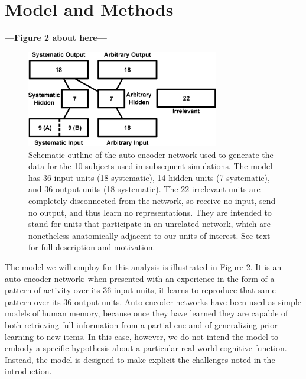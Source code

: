 \section{Model and Methods}
\textbf{---Figure 2 about here---}
\begin{figure}
\centering
\includegraphics[width=0.75\textwidth]{figures/model_outline.eps}
\caption{\label{fig.model_outline} Schematic outline of the auto-encoder network used to generate the data for the 10 subjects used in subsequent simulations. The model has 36 input units (18 systematic), 14 hidden units (7 systematic), and 36 output units (18 systematic). The 22 irrelevant units are completely disconnected from the network, so receive no input, send no output, and thus learn no representations. They are intended to stand for units that participate in an unrelated network, which are nonetheless anatomically adjacent to our units of interest. See text for full description and motivation.}
\end{figure}


The model we will employ for this analysis is illustrated in Figure 2. It is an auto-encoder network: when presented with an experience in the form of a pattern of activity over its 36 input units, it learns to reproduce that same pattern over its 36 output units. Auto-encoder networks have been used as simple models of human memory, because once they have learned they are capable of both retrieving full information from a partial cue and of generalizing prior learning to new items. In this case, however, we do not intend the model to embody a specific hypothesis about a particular real-world cognitive function. Instead, the model is designed to make explicit the challenges noted in the introduction. 

